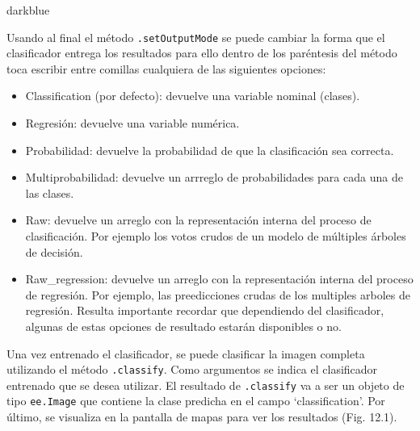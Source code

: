 \documentclass[
  12pt,
  letterpaper,
  twoside]{book}
\providecommand{\tightlist}{%
  \setlength{\itemsep}{0pt}\setlength{\parskip}{0pt}}
\begin{document}
\begin{bluebox2}

\begin{awesomeblock}{5pt}{\faLightbulb}{darkblue}

Usando al final el método \texttt{.setOutputMode} se puede cambiar la forma que el clasificador entrega los resultados para ello dentro de los paréntesis del método toca escribir entre comillas cualquiera de las siguientes opciones:

\begin{itemize}
\tightlist
\item
  Classification (por defecto): devuelve una variable nominal (clases).
\item
  Regresión: devuelve una variable numérica.
\item
  Probabilidad: devuelve la probabilidad de que la clasificación sea correcta.
\item
  Multiprobabilidad: devuelve un arrreglo de probabilidades para cada una de las clases.
\item
  Raw: devuelve un arreglo con la representación interna del proceso de clasificación. Por ejemplo los votos crudos de un modelo de múltiples árboles de decisión.
\item
  Raw\_regression: devuelve un arreglo con la representación interna del proceso de regresión. Por ejemplo, las preedicciones crudas de los multiples arboles de regresión.
  Resulta importante recordar que dependiendo del clasificador, algunas de estas opciones de resultado estarán disponibles o no.
\end{itemize}

\end{awesomeblock}

\end{bluebox2}

Una vez entrenado el clasificador, se puede clasificar la imagen completa utilizando el método \texttt{.classify}. Como argumentos se indica el clasificador entrenado que se desea utilizar. El resultado de \texttt{.classify} va a ser un objeto de tipo \texttt{ee.Image} que contiene la clase predicha en el campo `classification'. Por último, se visualiza en la pantalla de mapas para ver los resultados (Fig. 12.1).
\end{document}
